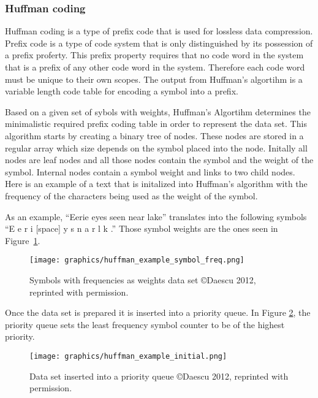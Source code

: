 \documentclass[letterpaper, 12pt]{article}
\begin{document}
\subsubsection{Huffman coding}
Huffman coding is a type of prefix code that is used for lossless data compression. Prefix code is a type
of code system that is only distinguished by its possession of a prefix proferty. This prefix property requires
that no code word in the system that is a prefix of any other code word in the system. Therefore each code word
must be unique to their own scopes. The output from Huffman's algortihm is a variable length code table for encoding
a symbol into a prefix.
\par\vspace{\baselineskip}
Based on a given set of sybols with weights, Huffman's Algortihm determines the minimalistic required prefix coding
table in order to represent the data set. This algorithm starts by creating a binary tree of nodes. These nodes
are stored in a regular array which size depends on the symbol placed into the node. Initally all nodes are leaf
nodes and all those nodes contain the symbol and the weight of the symbol. Internal nodes contain a symbol weight
and links to two child nodes. Here is an example of a text that is initalized into Huffman's algorithm with the
frequency of the characters being used as the weight of the symbol.
\par\vspace{\baselineskip}
As an example, ``Eerie eyes seen near lake'' translates into the following symbols ``E e r i [space] y s n a r l k .''
Those symbol weights are the ones seen in Figure~\ref{fig:huffman_ex_sym_freq}.
\par\vspace{\baselineskip}

\begin{figure}[H]
  \centering
  \texttt{[image: graphics/huffman\_example\_symbol\_freq.png]}
  \caption{Symbols with frequencies as weights data set \copyright Daescu 2012, reprinted with permission.\cite{huffman}}
  \label{fig:huffman_ex_sym_freq}
\end{figure}

Once the data set is prepared it is inserted into a priority queue. In Figure \ref{huff_example}, the priority 
queue sets the least frequency symbol counter to be of the highest priority.
\par\vspace{\baselineskip}

\begin{figure}
  \centering
  \texttt{[image: graphics/huffman\_example\_initial.png]}
  \caption{Data set inserted into a priority queue  \copyright Daescu 2012, reprinted with permission.\cite{huffman}}
  \label{huff_example}
\end{figure}
\end{document}
